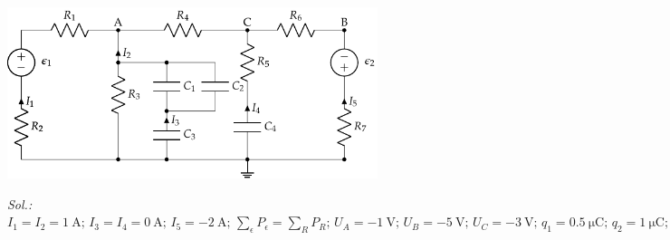\begin{enumerate}
  \begin{center}
    \includegraphics[height=5cm]{../figs/mallas_agrupacion_condensadores.pdf}
  \end{center}

  \emph{Sol.:\;
    $I_1=I_2=\qty{1}{\ampere};\, I_3=I_4=\qty{0}{\ampere};\, I_5=\qty{-2}{\ampere};\, \sum_\epsilon P_\epsilon = \sum_R P_R;\, U_A=\qty{-1}{\volt};\, U_B=\qty{-5}{\volt};\, U_C=\qty{-3}{\volt};\, q_1=\qty{0.5}{\micro\coulomb};\, q_2 = \qty{1}{\micro\coulomb};\, q_3=\qty{1.5}{\micro\coulomb};\, q_4=\qty{12}{\micro\coulomb}$}



\end{enumerate}
